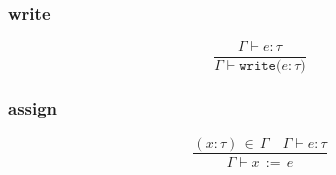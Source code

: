 \documentclass[a4paper,12pt]{article}
\newcommand\resw[1]{\mathtt{#1}}
\newcommand\mi[1]{\mathit{#1}}
\begin{document}
    \subsubsection{write}
    \[
        \frac{\Gamma \vdash \mi{e} \colon \tau}%
        {\Gamma \vdash \resw{write(} \mi{e} \colon \tau \resw{)}}
    \]
    \subsubsection{assign}
    \[
        \frac{(\mi{x} \colon \tau) \, \in \, \Gamma \quad \Gamma \vdash \mi{e} \colon \tau}%
        {\Gamma \vdash \mi{x} \, \resw{:=} \, \mi{e}}
    \]
\end{document}
